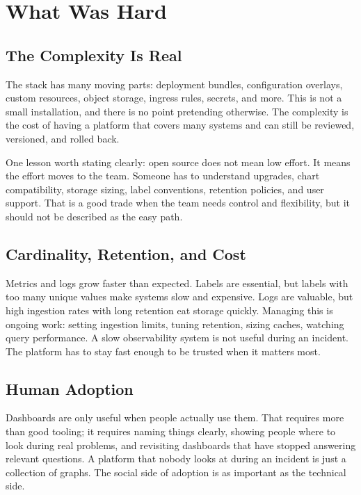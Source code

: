 \section{What Was Hard}

\subsection{The Complexity Is Real}

The stack has many moving parts: deployment bundles, configuration overlays, custom resources,
object storage, ingress rules, secrets, and more. This is not a small installation, and there is
no point pretending otherwise. The complexity is the cost of having a platform that covers many
systems and can still be reviewed, versioned, and rolled back.

One lesson worth stating clearly: open source does not mean low effort. It means the effort moves
to the team. Someone has to understand upgrades, chart compatibility, storage sizing, label
conventions, retention policies, and user support. That is a good trade when the team needs control
and flexibility, but it should not be described as the easy path.

\subsection{Cardinality, Retention, and Cost}

Metrics and logs grow faster than expected. Labels are essential, but labels with too many unique
values make systems slow and expensive. Logs are valuable, but high ingestion rates with long
retention eat storage quickly. Managing this is ongoing work: setting ingestion limits, tuning
retention, sizing caches, watching query performance. A slow observability system is not useful
during an incident. The platform has to stay fast enough to be trusted when it matters most.

\subsection{Human Adoption}

Dashboards are only useful when people actually use them. That requires more than good tooling; it
requires naming things clearly, showing people where to look during real problems, and revisiting
dashboards that have stopped answering relevant questions. A platform that nobody looks at during
an incident is just a collection of graphs. The social side of adoption is as important as the
technical side.